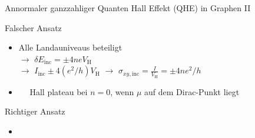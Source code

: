 \documentclass[../defence.tex]{subfiles}
\begin{document}
  \begin{frame}{Annormaler ganzzahliger Quanten Hall Effekt (QHE) in Graphen II}
        \begin{alertblock}{Falscher Ansatz}
          \begin{itemize}
            \item Alle Landauniveaus beteiligt\\
            $\rightarrow$ $\delta E_\mathrm{inc}=\pm 4neV_\mathrm{H}$\\
            $\rightarrow$ $I_\mathrm{inc}\pm 4(e^2/h)V_\mathrm{H}$ $\rightarrow$ $\sigma_ {xy,\mathrm{inc}}=\frac{I}{V_\mathrm{H}}=\pm 4ne^2 / h$
            \item \faBolt$\quad$ Hall plateau bei $n=0$, wenn $\mu$ auf dem Dirac-Punkt liegt
          \end{itemize}
        \end{alertblock}
        \begin{exampleblock}{Richtiger Ansatz}
          \begin{itemize}
            \item
          \end{itemize}
        \end{exampleblock}
  \end{frame}
\end{document}
